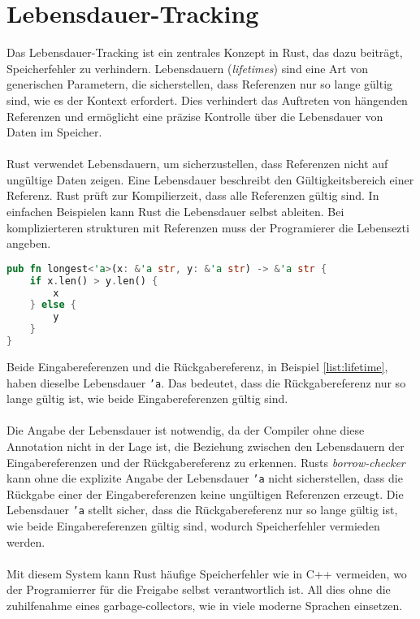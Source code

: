\chapter{Lebensdauer-Tracking}

Das Lebensdauer-Tracking ist ein zentrales Konzept in Rust, das dazu beiträgt, Speicherfehler zu verhindern. 
Lebensdauern (\emph{lifetimes}) sind eine Art von generischen Parametern, die sicherstellen, dass Referenzen nur so lange gültig sind, wie es der Kontext erfordert. 
Dies verhindert das Auftreten von hängenden Referenzen und ermöglicht eine präzise Kontrolle über die Lebensdauer von Daten im Speicher.\\
\\
Rust verwendet Lebensdauern, um sicherzustellen, dass Referenzen nicht auf ungültige Daten zeigen. 
Eine Lebensdauer beschreibt den Gültigkeitsbereich einer Referenz. 
Rust prüft zur Kompilierzeit, dass alle Referenzen gültig sind.
In einfachen Beispielen kann Rust die Lebensdauer selbst ableiten.
Bei komplizierteren strukturen mit Referenzen muss der Programierer die Lebensezti angeben.
\begin{lstlisting}[language=Rust, caption={Expliziete lifetime}, label=list:lifetime]
pub fn longest<'a>(x: &'a str, y: &'a str) -> &'a str {
    if x.len() > y.len() {
        x
    } else {
        y
    }
}
\end{lstlisting}
\noindent
Beide Eingabereferenzen und die Rückgabereferenz, in Beispiel \ref{list:lifetime}, haben dieselbe Lebensdauer \texttt{'a}. 
Das bedeutet, dass die Rückgabereferenz nur so lange gültig ist, wie beide Eingabereferenzen gültig sind.\\
\\
Die Angabe der Lebensdauer ist notwendig, da der Compiler ohne diese Annotation nicht in der Lage ist, die Beziehung zwischen den Lebensdauern der Eingabereferenzen und der Rückgabereferenz zu erkennen. 
Rusts \textit{\gls{borrow-checker}} kann ohne die explizite Angabe der Lebensdauer \texttt{'a} nicht sicherstellen, dass die Rückgabe einer der Eingabereferenzen keine ungültigen Referenzen erzeugt. 
Die Lebensdauer \texttt{'a} stellt sicher, dass die Rückgabereferenz nur so lange gültig ist, wie beide Eingabereferenzen gültig sind, wodurch Speicherfehler vermieden werden.\\
\\
Mit diesem System kann Rust häufige Speicherfehler wie in C++ vermeiden, wo der Programierrer für die Freigabe selbst verantwortlich ist.
All dies ohne die zuhilfenahme eines garbage-collectors, wie in viele moderne Sprachen einsetzen.
